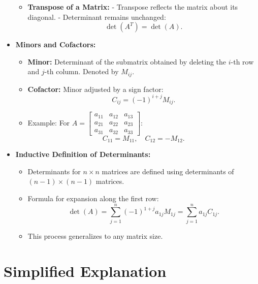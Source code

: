 \documentclass{article}
\begin{document}
\begin{itemize}
\begin{itemize}
      \item \textbf{Transpose of a Matrix:}
        - Transpose reflects the matrix about its diagonal.
        - Determinant remains unchanged:
        \[
          \det(A^T) = \det(A).
        \]
    \end{itemize}

  \item \textbf{Minors and Cofactors:}
    \begin{itemize}
      \item \textbf{Minor:} Determinant of the submatrix obtained by deleting the $i$-th row and $j$-th column. Denoted by $M_{ij}$.
      \item \textbf{Cofactor:} Minor adjusted by a sign factor:
        \[
          C_{ij} = (-1)^{i+j} M_{ij}.
        \]
      \item Example:
        For $A =
        \begin{bmatrix}
          a_{11} & a_{12} & a_{13} \\
          a_{21} & a_{22} & a_{23} \\
          a_{31} & a_{32} & a_{33}
        \end{bmatrix}$:
        \[
          C_{11} = M_{11}, \quad C_{12} = -M_{12}.
        \]
    \end{itemize}

  \item \textbf{Inductive Definition of Determinants:}
    \begin{itemize}
      \item Determinants for $n \times n$ matrices are defined using determinants of $(n-1) \times (n-1)$ matrices.
      \item Formula for expansion along the first row:
        \[
          \det(A) = \sum_{j=1}^n (-1)^{1+j} a_{1j} M_{1j} = \sum_{j=1}^n a_{1j} C_{1j}.
        \]
      \item This process generalizes to any matrix size.
    \end{itemize}
\end{itemize}

\section*{Simplified Explanation}
\end{document}
